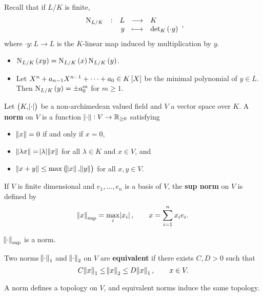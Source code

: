 Recall that if $ L / K $ is finite,
$$ \function[\N_{L / K}]{L}{K}{y}{\det_K \br{\cdot y}}, $$
where $ \cdot y : L \to L $ is the $ K $-linear map induced by multiplication by $ y $.

\begin{fact*}
\hfill
\begin{itemize}
\item $ \N_{L / K}\br{xy} = \N_{L / K}\br{x}\N_{L / K}\br{y} $.
\item Let $ X^n + a_{n - 1}X^{n - 1} + \dots + a_0 \in K\sbr{X} $ be the minimal polynomial of $ y \in L $. Then $ \N_{L / K}\br{y} = \pm a_0^m $ for $ m \ge 1 $.
\end{itemize}
\end{fact*}

\pagebreak

\begin{definition}
Let $ \br{K, \abs{\cdot}} $ be a non-archimedean valued field and $ V $ a vector space over $ K $. A \textbf{norm} on $ V $ is a function $ \norm{\cdot} : V \to \mathbb{R}_{\ge 0} $ satisfying
\begin{itemize}
\item $ \norm{x} = 0 $ if and only if $ x = 0 $,
\item $ \norm{\lambda x} = \abs{\lambda}\norm{x} $ for all $ \lambda \in K $ and $ x \in V $, and
\item $ \norm{x + y} \le \max\br{\norm{x}, \norm{y}} $ for all $ x, y \in V $.
\end{itemize}
\end{definition}

\begin{example*}
If $ V $ is finite dimensional and $ e_1, \dots, e_n $ is a basis of $ V $, the \textbf{sup norm} on $ V $ is defined by
$$ \norm{x}_{\sup} = \max_i \abs{x_i}, \qquad x = \sum_{i = 1}^n x_ie_i. $$
\end{example*}

\begin{exercise*}
$ \norm{\cdot}_{\sup} $ is a norm.
\end{exercise*}

\begin{definition}
Two norms $ \norm{\cdot}_1 $ and $ \norm{\cdot}_2 $ on $ V $ are \textbf{equivalent} if there exists $ C, D > 0 $ such that
$$ C\norm{x}_1 \le \norm{x}_2 \le D\norm{x}_1, \qquad x \in V. $$
\end{definition}

\begin{fact*}
A norm defines a topology on $ V $, and equivalent norms induce the same topology.
\end{fact*}

